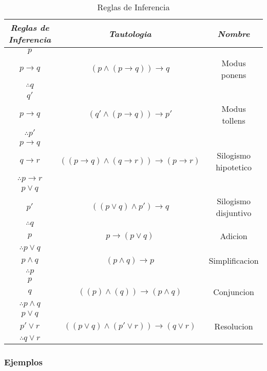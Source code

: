 \documentclass[]{article}
\begin{document}
\begin{table}[H]
	\caption*{Reglas de Inferencia}
	\begin{center}
		\begin{tabular}{|c|c|c|}
			\hline
			\textbf{\textit{Reglas de Inferencia}} & \textbf{\textit{Tautologia}} & \textbf{\textit{Nombre}}\\
			\hline
			$p$ &  & \\
			$p \rightarrow q$ & $(p\wedge (p \rightarrow q)) \rightarrow q$ & Modus ponens\\
			$\therefore q$ &  & \\
			\hline
			$q'$ &  & \\
			$p \rightarrow q$ & $(q' \wedge (p \rightarrow q)) \rightarrow p'$ & Modus tollens\\ 
			$\therefore p'$ &  & \\
			\hline
			$p \rightarrow q$ &  & \\
			$q \rightarrow r$ & $((p \rightarrow q) \wedge (q \rightarrow r)) \rightarrow (p \rightarrow r)$ & Silogismo hipotetico\\
			$\therefore p \rightarrow r$ &  & \\
			\hline
			$p \vee q$ &  & \\
			$p'$ & $((p \vee q) \wedge p') \rightarrow q$ & Silogismo disjuntivo\\
			$\therefore q$ &  & \\
			\hline
			$p$ & $p \rightarrow (p \vee q)$ & Adicion\\
			$\therefore p \vee q$ &  & \\
			\hline
			$p \wedge q$ & $(p \wedge q) \rightarrow p$ & Simplificacion\\
			$\therefore p$ &  & \\
			\hline
			$p$ &  & \\
			$q$ & $((p) \wedge (q)) \rightarrow (p \wedge q)$ & Conjuncion\\
			$\therefore p \wedge q$ &  & \\
			\hline
			$p \vee q$ &  & \\
			$p' \vee r$ & $((p \vee q) \wedge (p' \vee r)) \rightarrow (q \vee r)$ & Resolucion\\
			$\therefore q \vee r$ &  & \\
			\hline
		\end{tabular}
	\end{center}
\end{table}

\subsubsection*{Ejemplos}
\end{document}
